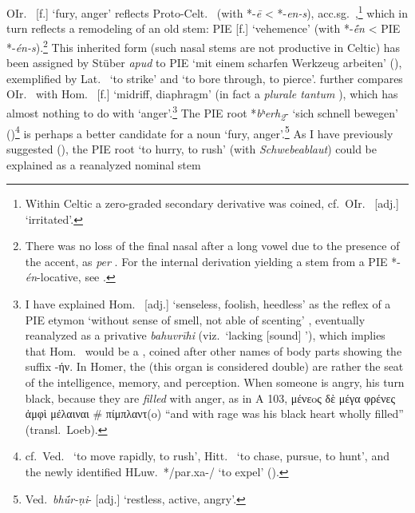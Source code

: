 \documentclass[output=paper,colorlinks,citecolor=brown]{langscibook}
\begin{document}
OIr.\  [f.] ‘fury, anger’ reflects Proto-Celt.\  (with *-\textit{ē} < *-\textit{en-s}), acc.sg.\ ,\footnote{Within Celtic a zero-graded secondary derivative   was coined, cf.\ OIr.\  [adj.] ‘irritated’.}  which in turn reflects a remodeling of an old  stem: PIE  [f.] ‘vehemence’ (with *-\textit{ḗn} < PIE *-\textit{én-s}).\footnote{There was no loss of the final nasal after a long vowel due to the presence of the accent, as \textit{per} \citet[218--219]{Hardarson2005}. For the internal derivation yielding a  stem from a PIE  *-\textit{én}-locative, see \citet[324, fn.\ 181]{Neri2017}.} This inherited form (such nasal stems are not productive in Celtic) has been assigned by Stüber \textit{apud} \citet[1--2]{Balles2002} to PIE  ‘mit einem scharfen Werkzeug arbeiten’ (), exemplified by Lat.\  ‘to strike’ and  ‘to bore through, to pierce’. \citet[7]{Balles2002} further compares OIr.\  with Hom.\  [f.] ‘midriff, diaphragm’ (in fact a \textit{plurale tantum} ), which has almost nothing to do with ‘anger’.\footnote{I have explained Hom.\  [adj.] ‘senseless, foolish, heedless’  as the reflex of a PIE etymon  ‘without sense of smell, not able of scenting’ \citep{Garnier2021}, eventually reanalyzed as a privative \textit{bahuvrīhi}  (viz.\ ‘lacking [sound] ’), which implies that Hom.\   would be a , coined after other names of body parts showing the suffix -ήν. In Homer, the   (this organ is considered double) are rather the seat of the intelligence, memory, and perception. When someone is angry, his   turn black, because they are \textit{filled} with anger, as in A 103, μένεoς  δὲ μέγα φρένες  ἀμφὶ μέλαιναι \# πίμπλαντ(o) “and with rage was his black heart wholly filled” (transl.\ Loeb).} The PIE root *\textit{bʰerh\textsubscript{2}}- ‘sich schnell bewegen’ ()\footnote{cf.\ Ved.\  ‘to move rapidly, to rush’, Hitt.\  ‘to chase, pursue, to hunt’, and the newly identified HLuw.\ */par.xa-/ ‘to expel’ (\citealt[204--206]{Melchert2016}).} is perhaps a better candidate for a noun ‘fury, anger’.\footnote{Ved.\ \textit{bhū́r-ṇi}-  [adj.] ‘restless, active, angry’.} As I have previously suggested (\citealt[53, fn.\ 6]{Garnier2021}), the PIE root  ‘to hurry, to rush’ (with \textit{Schwebeablaut})  could be explained as a reanalyzed nominal stem 
\end{document}
